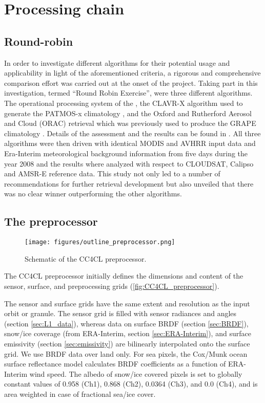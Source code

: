 \section{Processing chain}\label{processing_chain}

\subsection{Round-robin}

In order to investigate different algorithms for their potential usage and
applicability in light of the aforementioned criteria, a rigorous and
comprehensive comparison effort was carried out at the onset of the
project.
Taking part in this investigation, termed ``Round Robin Exercise'',
were three different algorithms. The operational processing system of the
\citet{CMSAF_web}, the CLAVR-X algorithm used to generate the PATMOS-x
climatology \citep{Heidinger13}, and the Oxford and Rutherford Aerosol and
Cloud (ORAC) retrieval \citep{Thomas09, Poulsen12} which was previously used
to produce the GRAPE climatology \citep{Thomas09_GRAPE, GRAPE_web}.
Details of the assessment and the results can be found in
\citet{Stengel15}. All three algorithms were then driven with identical MODIS
and AVHRR input data and Era-Interim meteorological background information
from five days during the year 2008 and the results where analyzed with
respect to CLOUDSAT, Calipso and AMSR-E reference data.
This study not only led to a number of recommendations for further retrieval
development but also unveiled that there was no clear winner outperforming the
other algorithms.

\subsection{The preprocessor}

\begin{figure}[h]
  \texttt{[image: figures/outline\_preprocessor.png]}
  \caption{Schematic of the CC4CL preprocessor.}
  \label{fig:CC4CL_preprocessor}
\end{figure}

The CC4CL preprocessor initially defines the dimensions and content of the sensor, surface, and preprocessing grids (\autoref{fig:CC4CL_preprocessor}). 

The sensor and surface grids have the same extent and resolution as the input orbit or granule. The sensor grid is filled with sensor radiances and angles (section \ref{sec:L1_data}), whereas data on surface BRDF (section \ref{sec:BRDF}), snow/ice coverage (from ERA-Interim, section \ref{sec:ERA-Interim}), and surface emissivity (section \ref{sec:emissivity}) are bilinearly interpolated onto the surface grid. We use BRDF data over land only. For sea pixels, the Cox/Munk ocean surface reflectance model calculates BRDF coefficients as a function of ERA-Interim wind speed. The albedo of snow/ice covered pixels is set to globally constant values of 0.958 (Ch1), 0.868 (Ch2), 0.0364 (Ch3), and 0.0 (Ch4), and is area weighted in case of fractional sea/ice cover. 

